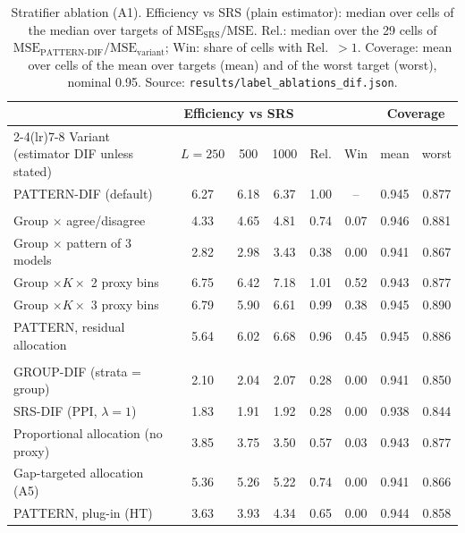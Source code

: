 \documentclass[pdflatex,sn-mathphys-num,iicol]{sn-jnl}
\theoremstyle{thmstyleone}
\theoremstyle{thmstyletwo}
\theoremstyle{thmstylethree}
\begin{document}
\begin{table}[t]
\centering\footnotesize
\caption{Stratifier ablation (A1). Efficiency vs SRS (plain estimator): median over cells of the median over targets of $\mathrm{MSE}_{\mathrm{SRS}}/\mathrm{MSE}$. Rel.: median over the 29 cells of $\mathrm{MSE}_{\mathrm{PATTERN\text{-}DIF}}/\mathrm{MSE}_{\mathrm{variant}}$; Win: share of cells with Rel.\ $>1$. Coverage: mean over cells of the mean over targets (mean) and of the worst target (worst), nominal 0.95. Source: \texttt{results/label\_ablations\_dif.json}.}
\label{tab:abl-design}
\begin{tabular}{lccccccc}
\toprule
 & \multicolumn{3}{c}{Efficiency vs SRS} & & & \multicolumn{2}{c}{Coverage} \\
\cmidrule(lr){2-4}\cmidrule(lr){7-8}
Variant (estimator DIF unless stated) & $L=250$ & 500 & 1000 & Rel. & Win & mean & worst \\
\midrule
PATTERN-DIF (default) & 6.27 & 6.18 & 6.37 & 1.00 & -- & 0.945 & 0.877 \\
\addlinespace
\multicolumn{8}{l}{\emph{A1: stratifier}}\\
Group $\times$ agree/disagree & 4.33 & 4.65 & 4.81 & 0.74 & 0.07 & 0.946 & 0.881 \\
Group $\times$ pattern of 3 models & 2.82 & 2.98 & 3.43 & 0.38 & 0.00 & 0.941 & 0.867 \\
Group $\times K\times$ 2 proxy bins & 6.75 & 6.42 & 7.18 & 1.01 & 0.52 & 0.943 & 0.877 \\
Group $\times K\times$ 3 proxy bins & 6.79 & 5.90 & 6.61 & 0.99 & 0.38 & 0.945 & 0.890 \\
PATTERN, residual allocation & 5.64 & 6.02 & 6.68 & 0.96 & 0.45 & 0.945 & 0.886 \\
\addlinespace
\multicolumn{8}{l}{\emph{References}}\\
GROUP-DIF (strata = group) & 2.10 & 2.04 & 2.07 & 0.28 & 0.00 & 0.941 & 0.850 \\
SRS-DIF (PPI, $\lambda=1$) & 1.83 & 1.91 & 1.92 & 0.28 & 0.00 & 0.938 & 0.844 \\
Proportional allocation (no proxy) & 3.85 & 3.75 & 3.50 & 0.57 & 0.03 & 0.943 & 0.877 \\
Gap-targeted allocation (A5) & 5.36 & 5.26 & 5.22 & 0.74 & 0.00 & 0.941 & 0.866 \\
PATTERN, plug-in (HT) & 3.63 & 3.93 & 4.34 & 0.65 & 0.00 & 0.944 & 0.858 \\
\bottomrule
\end{tabular}

\end{table}
\end{document}
